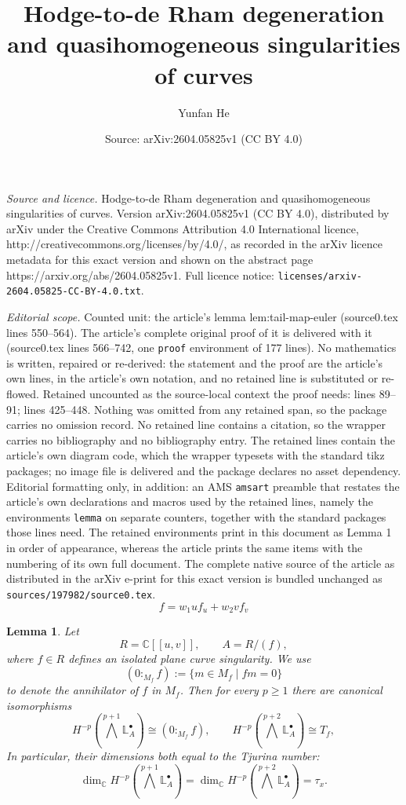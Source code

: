 \documentclass[10pt,a4paper]{amsart}
\title{Hodge-to-de Rham degeneration and quasihomogeneous singularities of curves}
\author{Yunfan He}
\date{Source: arXiv:2604.05825v1 (CC BY 4.0)}
\newtheorem{lemma}{Lemma}
\renewcommand{\ge}{\geqslant}
\begin{document}
\maketitle

\noindent\emph{Source and licence.} Hodge-to-de Rham degeneration and quasihomogeneous singularities of curves. Version arXiv:2604.05825v1 (CC BY 4.0), distributed by arXiv under the Creative Commons Attribution 4.0 International licence, http://creativecommons.org/licenses/by/4.0/, as recorded in the arXiv licence metadata for this exact version and shown on the abstract page https://arxiv.org/abs/2604.05825v1. Full licence notice: \texttt{licenses/arxiv-2604.05825-CC-BY-4.0.txt}.\par\smallskip

\noindent\textit{Editorial scope.} Counted unit: the article's lemma lem:tail-map-euler (source0.tex lines 550--564). The article's complete original proof of it is delivered with it (source0.tex lines 566--742, one \texttt{proof} environment of 177 lines). No mathematics is written, repaired or re-derived: the statement and the proof are the article's own lines, in the article's own notation, and no retained line is substituted or re-flowed.  Retained uncounted as the source-local context the proof needs: lines 89--91; lines 425--448.  Nothing was omitted from any retained span, so the package carries no omission record.  No retained line contains a citation, so the wrapper carries no bibliography and no bibliography entry.  The retained lines contain the article's own diagram code, which the wrapper typesets with the standard tikz packages; no image file is delivered and the package declares no asset dependency.  Editorial formatting only, in addition: an AMS \texttt{amsart} preamble that restates the article's own declarations and macros used by the retained lines, namely the environments \texttt{lemma} on separate counters, together with the standard packages those lines need.  The retained environments print in this document as Lemma 1 in order of appearance, whereas the article prints the same items with the numbering of its own full document.  The complete native source of the article as distributed in the arXiv e-print for this exact version is bundled unchanged as \texttt{sources/197982/source0.tex}.
\begin{equation}\label{eq:weighted-euler}
f=w_1u f_u+w_2v f_v
\end{equation}

\begin{lemma}\label{lem:tail-map-quotient}
Let
\[
  R=\mathbb C[[u,v]],\qquad A=R/(f),
\]
where $f\in R$ defines an isolated plane curve singularity. We use
\[
  (0:_{M_f}f):=\{m\in M_f\mid fm=0\}
\]
to denote the annihilator of \(f\) in \(M_f\). Then for every $p\ge 1$ there are canonical isomorphisms
\[
H^{-p}\!\left(\bigwedge^{p+1}\mathbb{L}^{\bullet}_A\right)\cong (0:_{M_f}f),
\qquad
H^{-p}\!\left(\bigwedge^{p+2}\mathbb{L}^{\bullet}_A\right)\cong T_f,
\]
In particular, their dimensions both equal to the Tjurina number:
\[
  \dim_{\mathbb C}H^{-p}\!\left(\bigwedge^{p+1}\mathbb{L}^{\bullet}_A\right)
  =
  \dim_{\mathbb C}H^{-p}\!\left(\bigwedge^{p+2}\mathbb{L}^{\bullet}_A\right)
  =
  \tau_x.
\]
\end{lemma}
\end{document}

